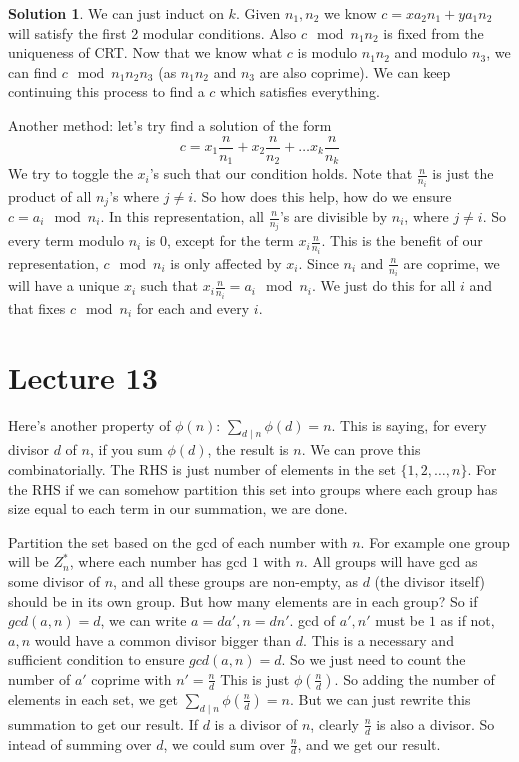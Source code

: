 \documentclass[a4paper,10pt]{article}
\theoremstyle{definition} %
\newtheorem*{solution}{Solution}
\begin{document}
    \begin{solution}
        We can just induct on $k$. Given $n_1, n_2$ we know $c = xa_2n_1 + ya_1n_2$
        will satisfy the first 2 modular conditions. 
        Also $c \mod n_1n_2$ is fixed from the uniqueness of CRT. 
        Now that we know what $c$ is modulo $n_1n_2$ and modulo 
        $n_3$, we can find $c \mod n_1n_2n_3$ (as $n_1n_2$ and $n_3$ are also coprime). 
        We can keep continuing this process to find 
        a $c$ which satisfies everything.

        Another method: let's try find a solution of the form 
        \[c = x_1 \frac{n}{n_1} + x_2 \frac{n}{n_2} + \dots x_k \frac{n}{n_k}\]
        We try to toggle the $x_i$'s such that our condition holds. Note that $\frac{n}{n_i}$
        is just the product of all $n_j$'s where $j \neq i$.
        So how does this help, how do we ensure $c = a_i \mod n_i$. In this representation,
        all $\frac{n}{n_j}$'s are divisible by $n_i$, where $j \neq i$. So every term modulo 
        $n_i$ is 0, except for the term $x_i\frac{n}{n_i}$. This is the benefit of our representation,
        $c \mod n_i$ is only affected by $x_i$. Since $n_i$ and $\frac{n}{n_i}$ are coprime, we 
        will have a unique $x_i$ such that $x_i\frac{n}{n_i} = a_i \mod n_i$. We just do this for all
        $i$ and that fixes $c \mod n_i$ for each and every $i$.
    \end{solution}

    \newpage
    \section{Lecture 13}

    Here's another property of $\phi(n)$: $\sum_{d \mid n} \phi(d) = n$. This is saying,
    for every divisor $d$ of $n$, if you sum $\phi(d)$, the result is $n$. We can prove 
    this combinatorially. The RHS is just number of elements in the set $\{1,2,\dots,n\}$.
    For the RHS if we can somehow partition this set into groups where each group has size
    equal to each term in our summation, we are done.

    Partition the set based on the gcd of each number with $n$. For example one group will
    be $Z_n^*$, where each number has gcd $1$ with $n$. All groups will have gcd as some
    divisor of $n$, and all these groups are non-empty, as $d$ (the divisor itself) should
    be in its own group. But how many elements are in each group? So if $gcd(a,n)=d$, 
    we can write $a = da', n = dn'$. gcd of $a',n'$ must be $1$ as if not, $a,n$ would
    have a common divisor bigger than $d$. This is a necessary and sufficient condition
    to ensure $gcd(a,n)=d$. So we just need to count the number of $a'$ coprime with $n' = \frac{n}{d}$
    This is just $\phi(\frac{n}{d})$. So adding the number of elements in each set, we get 
    $\sum_{d \mid n} \phi(\frac{n}{d}) = n$. But we can just rewrite this summation to get 
    our result. If $d$ is a divisor of $n$, clearly $\frac{n}{d}$ is also a divisor. So intead 
    of summing over $d$, we could sum over $\frac{n}{d}$, and we get our result.
\end{document}
